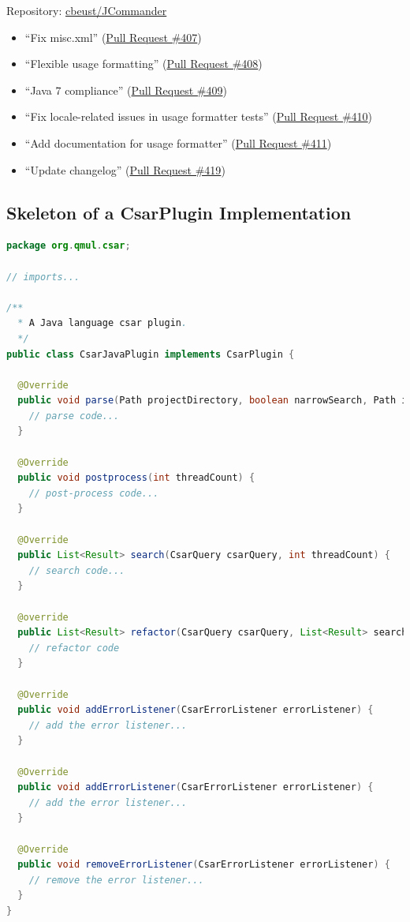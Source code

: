 \documentclass[12pt, letterpaper]{article}
\begin{document}
Repository: \href{https://github.com/cbeust/jcommander}{cbeust/JCommander}
\begin{itemize}
  \item ``Fix misc.xml'' (\href{https://github.com/cbeust/jcommander/pull/407}{Pull Request \#407})
  \item ``Flexible usage formatting'' (\href{https://github.com/cbeust/jcommander/pull/408}{Pull Request \#408})
  \item ``Java 7 compliance'' (\href{https://github.com/cbeust/jcommander/pull/409}{Pull Request \#409})
  \item ``Fix locale-related issues in usage formatter tests'' (\href{https://github.com/cbeust/jcommander/pull/410}{Pull Request \#410})
  \item ``Add documentation for usage formatter'' (\href{https://github.com/cbeust/jcommander/pull/411}{Pull Request \#411})
  \item ``Update changelog'' (\href{https://github.com/cbeust/jcommander/pull/419}{Pull Request \#419})
\end{itemize}

\subsection{Skeleton of a CsarPlugin Implementation}
\label{apx:SkeletonCsarPluginImplementation}

\begin{lstlisting}[language=Java]
package org.qmul.csar;

// imports...

/**
  * A Java language csar plugin.
  */
public class CsarJavaPlugin implements CsarPlugin {

  @Override
  public void parse(Path projectDirectory, boolean narrowSearch, Path ignoreFile, int threadCount) {
    // parse code...
  }

  @Override
  public void postprocess(int threadCount) {
    // post-process code...
  }

  @Override
  public List<Result> search(CsarQuery csarQuery, int threadCount) {
    // search code...
  }

  @override
  public List<Result> refactor(CsarQuery csarQuery, List<Result> searchResults, int threadCount) {
    // refactor code
  }

  @Override
  public void addErrorListener(CsarErrorListener errorListener) {
    // add the error listener...
  }

  @Override
  public void addErrorListener(CsarErrorListener errorListener) {
    // add the error listener...
  }

  @Override
  public void removeErrorListener(CsarErrorListener errorListener) {
    // remove the error listener...
  }
}
\end{lstlisting}
\end{document}

